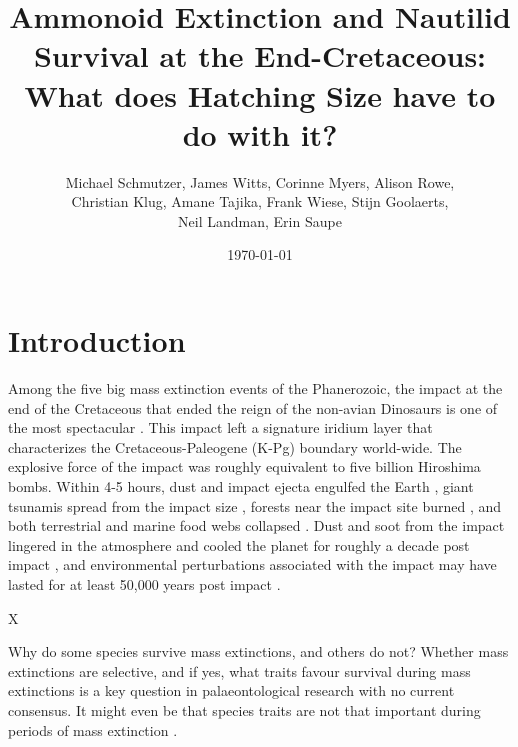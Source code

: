 \documentclass[a4paper]{article}
\title{Ammonoid Extinction and Nautilid Survival at the End-Cretaceous: What does Hatching Size have to do with it?}
\date{\today}
\author{Michael Schmutzer, James Witts, Corinne Myers, Alison Rowe, \\ Christian Klug, Amane Tajika, Frank Wiese, Stijn Goolaerts, \\ Neil Landman, Erin Saupe}
\begin{document}
\maketitle

\onehalfspacing


\section*{Introduction}

Among the five big mass extinction events of the Phanerozoic, the impact at the end of the Cretaceous that ended the reign of the non-avian Dinosaurs is one of the most spectacular \parencite{alvarezExtraterrestrialCauseCretaceousTertiary1980, olssonEjectaLayerCretaceousTertiary1997, morganChicxulubImpactIts2022, chiarenzaAsteroidImpactNot2020}. This impact left a signature iridium layer that characterizes the Cretaceous-Paleogene (K-Pg) boundary world-wide. 
The explosive force of the impact was roughly equivalent to five billion Hiroshima bombs.
Within 4-5 hours, dust and impact ejecta engulfed the Earth \parencite{senelChicxulubImpactWinter2023, morganChicxulubImpactIts2022}, giant tsunamis spread from the impact size \parencite{rangeChicxulubImpactProduced2022, depalmaSeismicallyInducedOnshore2019}, 
forests near the impact site burned \parencite{belcherExperimentalAssessmentIgnition2015, morganRevisitingWildfiresKPg2013, goldinSelfshieldingThermalRadiation2009, lyonsOrganicMatterChicxulub2020},
and both terrestrial \parencite{sheehanMajorExtinctionsLanddwelling1992}
and marine food webs collapsed \parencite{dhondtConsequencesCretaceousPaleogene2005,
yingDarknessBodySize2026, sosa-montesdeocaIntenseChangesMain2024, henehanRapidOceanAcidification2019}. Dust and soot from the impact lingered in the atmosphere and cooled the planet for roughly a decade post impact \parencite{artemievaQuantifyingReleaseClimateActive2017, senelChicxulubImpactWinter2023}, and 
environmental perturbations associated with the impact may have lasted for at least 50,000 years post impact \parencite{liUnstableClimate500002025}.

X

Why do some species survive mass extinctions, and others do not? 
Whether mass extinctions are selective, and if yes, what traits favour survival during mass extinctions is a key question in palaeontological research \parencite{fosterHowPredictableAre2023, payneSelectivityMassExtinctions2023, smithIdentifyingBigQuestions2025} with no current consensus. 
It might even be that species traits are not that important during periods of mass extinction \parencite{monarrezMassExtinctionsAlter2021, malanoskiClimateChangeImportant2024}.
\end{document}
